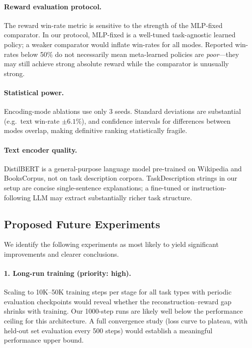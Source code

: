 \paragraph{Reward evaluation protocol.}
The reward win-rate metric is sensitive to the strength of the MLP-fixed comparator.
In our protocol, MLP-fixed is a well-tuned task-agnostic learned policy; a weaker comparator would inflate win-rates for all modes.
Reported win-rates below 50\% do not necessarily mean meta-learned policies are \emph{poor}---they may still achieve strong absolute reward while the comparator is unusually strong.

\paragraph{Statistical power.}
Encoding-mode ablations use only 3 seeds.
Standard deviations are substantial (e.g.\ text win-rate $\pm6.1\%$), and confidence intervals for differences between modes overlap, making definitive ranking statistically fragile.

\paragraph{Text encoder quality.}
DistilBERT is a general-purpose language model pre-trained on Wikipedia and BooksCorpus, not on task description corpora.
TaskDescription strings in our setup are concise single-sentence explanations; a fine-tuned or instruction-following LLM may extract substantially richer task structure.

\subsection{Proposed Future Experiments}

We identify the following experiments as most likely to yield significant improvements and clearer conclusions.

\paragraph{1. Long-run training (priority: high).}
Scaling to 10K--50K training steps per stage for all task types with periodic evaluation checkpoints would reveal whether the reconstruction--reward gap shrinks with training.
Our 1000-step runs are likely well below the performance ceiling for this architecture.
A full convergence study (loss curve to plateau, with held-out set evaluation every 500 steps) would establish a meaningful performance upper bound.

